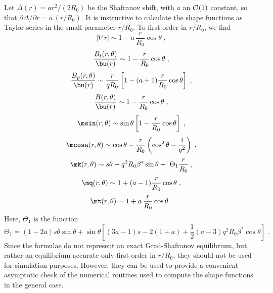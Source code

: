\noindent
Let $\Delta(r) = a r^2/(2 R_0)$ be the Shafranov shift, with $a$ 
an ${\cal O}(1)$ constant, so that $\partial \Delta/\partial r 
= a\,(r/R_0)$.  It is instructive to calculate the shape 
functions as Taylor series in the small parameter $r/R_0$.  
To first order in $r/R_0$, we find
%
\begin{equation}
|\nabla r | \sim 1-a\,\frac{r}{R_0} \cos\theta \; ,
\end{equation}
%
\begin{equation}
\frac{B_t(r,\theta)}{\bu(r)} \sim 1-\frac{r}{R_0} \cos\theta \; ,
\end{equation}
%
\begin{equation}
\frac{B_p(r,\theta)}{\bu(r)} \sim \frac{r}{q R_0} 
  \left[ 1- (a+1)\frac{r}{R_0}\cos\theta \right] \; ,
\end{equation}
%
\begin{equation}
\frac{B(r,\theta)}{\bu(r)} \sim 1-\frac{r}{R_0}\cos\theta \; ,
\end{equation}
%
\begin{equation}
\msin(r,\theta) \sim \sin\theta 
  \left[ 1 - \frac{r}{R_0} \cos\theta \right] \; ,
\end{equation}
%
\begin{equation}
\mcosa(r,\theta) \sim \cos\theta - \frac{r}{R_0} \left( 
  \cos^2\theta-\frac{1}{q^2} \right) \; ,
\end{equation}
%
\begin{equation}
\mk(r,\theta) \sim s \theta - q^2 R_0 \beta^* \sin\theta + \
  \Theta_1 \frac{r}{R_0} \; ,
\end{equation}
%
\begin{equation}
\mq(r,\theta) \sim 1+ (a-1) \frac{r}{R_0} \cos\theta \; , 
\end{equation}
%
\begin{equation}
\mt(r,\theta) \sim 1+ a\,\frac{r}{R_0} \cos\theta \; .
\end{equation}
%
Here, $\Theta_1$ is the function
%
\begin{equation}
\Theta_1 = (1-2 a)s \theta \sin\theta + \sin\theta \left[
(3a-1)s-2(1+a)+\frac{1}{2}(a-3) q^2 R_0 \beta^* \cos\theta\right] \; .
\end{equation}
%
Since the formulae do not represent an exact Grad-Shafranov 
equilibrium, but rather an equilibrium accurate only first order 
in $r/R_0$, they should not be used for simulation purposes.
However, they can be used to provide a convenient asymptotic 
check of the numerical routines used to compute the shape 
functions in the general case.   

